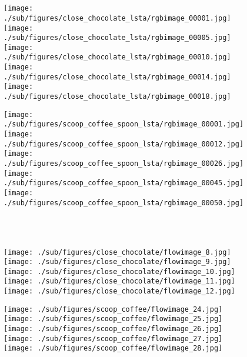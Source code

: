 \documentclass[10pt,twocolumn,letterpaper]{article}
\begin{document}
\begin{matrix*}[r]
\begin{figure*}[t]
\begin{subfigure}[b]{0.4\textwidth}
		\end{subfigure}\\ 
	\	
        \begin{subfigure}[b]{0.4\textwidth}
			\texttt{[image: ./sub/figures/close\_chocolate\_lsta/rgbimage\_00001.jpg]}
			\texttt{[image: ./sub/figures/close\_chocolate\_lsta/rgbimage\_00005.jpg]}
			\texttt{[image: ./sub/figures/close\_chocolate\_lsta/rgbimage\_00010.jpg]}
			\texttt{[image: ./sub/figures/close\_chocolate\_lsta/rgbimage\_00014.jpg]}
			\texttt{[image: ./sub/figures/close\_chocolate\_lsta/rgbimage\_00018.jpg]}
			\end{subfigure} \hskip 5mm
	        \begin{subfigure}[b]{0.4\textwidth}
			\texttt{[image: ./sub/figures/scoop\_coffee\_spoon\_lsta/rgbimage\_00001.jpg]}
			\texttt{[image: ./sub/figures/scoop\_coffee\_spoon\_lsta/rgbimage\_00012.jpg]}
			\texttt{[image: ./sub/figures/scoop\_coffee\_spoon\_lsta/rgbimage\_00026.jpg]}
			\texttt{[image: ./sub/figures/scoop\_coffee\_spoon\_lsta/rgbimage\_00045.jpg]}
			\texttt{[image: ./sub/figures/scoop\_coffee\_spoon\_lsta/rgbimage\_00050.jpg]}
		\end{subfigure}\\
	\	
       \begin{subfigure}[b]{0.4\textwidth}
		    \texttt{[image: ./sub/figures/close\_chocolate/flowimage\_8.jpg]}
			\texttt{[image: ./sub/figures/close\_chocolate/flowimage\_9.jpg]}
			 \texttt{[image: ./sub/figures/close\_chocolate/flowimage\_10.jpg]}
			\texttt{[image: ./sub/figures/close\_chocolate/flowimage\_11.jpg]}
			\texttt{[image: ./sub/figures/close\_chocolate/flowimage\_12.jpg]}
			\end{subfigure} \hskip 5mm
	        \begin{subfigure}[b]{0.4\textwidth}
			\texttt{[image: ./sub/figures/scoop\_coffee/flowimage\_24.jpg]}
			\texttt{[image: ./sub/figures/scoop\_coffee/flowimage\_25.jpg]}
			\texttt{[image: ./sub/figures/scoop\_coffee/flowimage\_26.jpg]}
			\texttt{[image: ./sub/figures/scoop\_coffee/flowimage\_27.jpg]}
			\texttt{[image: ./sub/figures/scoop\_coffee/flowimage\_28.jpg]}
		\end{subfigure}\\
	\	

\end{figure*}
\end{matrix*}
\end{document}
